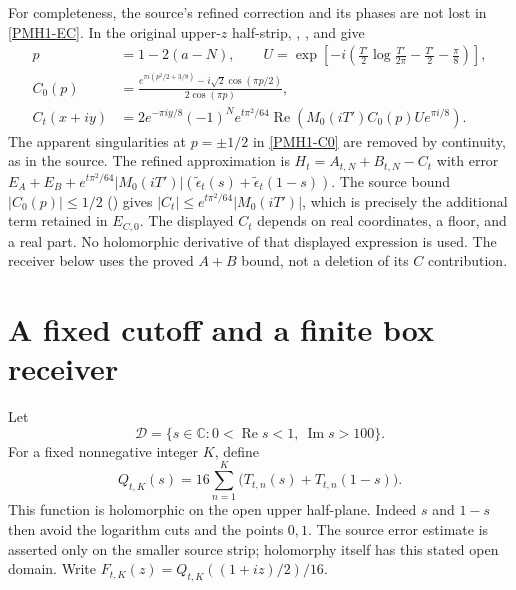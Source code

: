 \documentclass[11pt]{article}
\newcommand{\C}{\mathbb C}
\newcommand{\Rea}{\operatorname{Re}}
\newcommand{\Ima}{\operatorname{Im}}
\newcommand{\Src}[1]{\cite[original TeX label \texttt{#1}]{polymath}}
\begin{document}
For completeness, the source's refined correction and its phases are
not lost in \eqref{PMH1-EC}. In the original upper-$z$ half-strip,
\Src{abc-cor}, \Src{C0-def}, and \Src{U-def} give
\begin{align}
 p&=1-2(a-N),\qquad
 U=\exp\left[-i\left(\frac{T'}2\log\frac{T'}{2\pi}
                         -\frac{T'}2-\frac\pi8\right)\right],
 \label{PMH1-phase}\\
 C_0(p)&=\frac{e^{\pi i(p^2/2+3/8)}-i\sqrt2\cos(\pi p/2)}
                 {2\cos(\pi p)},
 \label{PMH1-C0}\\
 C_t(x+iy)&=2e^{-\pi iy/8}(-1)^N e^{t\pi^2/64}
       \Rea\left(M_0(iT')C_0(p)Ue^{\pi i/8}\right).
 \label{PMH1-C}
\end{align}
The apparent singularities at $p=\pm1/2$ in \eqref{PMH1-C0} are
removed by continuity, as in the source. The refined approximation
is $H_t=A_{t,N}+B_{t,N}-C_t$ with error
$E_A+E_B+e^{t\pi^2/64}|M_0(iT')|
(\widetilde\epsilon_t(s)+\widetilde\epsilon_t(1-s))$.
The source bound $|C_0(p)|\le1/2$ (\Src{cop}) gives
$|C_t|\le e^{t\pi^2/64}|M_0(iT')|$, which is precisely the
additional term retained in $E_{C,0}$.
The displayed $C_t$ depends on real coordinates, a floor, and a real
part. No holomorphic derivative of that displayed expression is used.
The receiver below uses the proved $A+B$ bound, not a deletion of its
$C$ contribution.

\section{A fixed cutoff and a finite box receiver}

Let
\[
 \mathcal D=\{s\in\C:0<\Rea s<1,\ \Ima s>100\}.
\]
For a fixed nonnegative integer $K$, define
\begin{equation}\label{PMH2-Q}
 Q_{t,K}(s)=16\sum_{n=1}^K
       \bigl(T_{t,n}(s)+T_{t,n}(1-s)\bigr).
\end{equation}
This function is holomorphic on the open upper half-plane. Indeed
$s$ and $1-s$ then avoid the logarithm cuts and the points $0,1$.
The source error estimate is asserted only on the smaller source
strip; holomorphy itself has this stated open domain.
Write $F_{t,K}(z)=Q_{t,K}((1+iz)/2)/16$.
\end{document}
